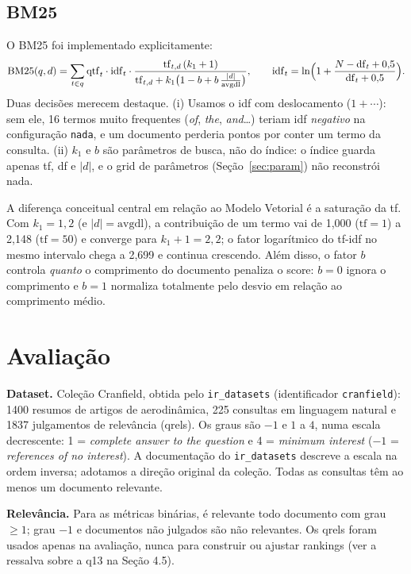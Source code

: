 \documentclass[10pt,a4paper]{article}
\begin{document}
\subsection{BM25}
O BM25 foi implementado explicitamente:
\[
  \mathrm{BM25}(q,d) = \sum_{t\in q} \mathrm{qtf}_t\cdot \mathrm{idf}_t\cdot
  \frac{\mathrm{tf}_{t,d}\,(k_1+1)}{\mathrm{tf}_{t,d} + k_1\bigl(1-b+b\,\frac{|d|}{\mathrm{avgdl}}\bigr)},
  \qquad
  \mathrm{idf}_t = \ln\Bigl(1+\frac{N-\mathrm{df}_t+0{,}5}{\mathrm{df}_t+0{,}5}\Bigr).
\]
Duas decisões merecem destaque. (i) Usamos o idf com deslocamento ($1+\cdots$): sem ele,
16 termos muito frequentes (\emph{of}, \emph{the}, \emph{and}\ldots) teriam idf
\emph{negativo} na configuração \texttt{nada}, e um documento perderia pontos por conter um termo
da consulta. (ii) $k_1$ e $b$ são parâmetros de busca, não do índice: o índice guarda
apenas tf, df e $|d|$, e o grid de parâmetros (Seção~\ref{sec:param}) não reconstrói nada.

A diferença conceitual central em relação ao Modelo Vetorial é a saturação da tf. Com
$k_1=1{,}2$ (e $|d|=\mathrm{avgdl}$), a contribuição de um termo vai de 1,000 ($\mathrm{tf}=1$) a
2,148 ($\mathrm{tf}=50$) e converge para $k_1+1=2{,}2$; o fator logarítmico do tf-idf no mesmo
intervalo chega a 2,699 e continua crescendo. Além disso, o fator $b$ controla \emph{quanto} o
comprimento do documento penaliza o score: $b=0$ ignora o comprimento e $b=1$ normaliza
totalmente pelo desvio em relação ao comprimento médio.

\section{Avaliação}
\textbf{Dataset.} Coleção Cranfield, obtida pelo \texttt{ir\_datasets} (identificador
\texttt{cranfield}): 1400 resumos de artigos de aerodinâmica, 225 consultas em linguagem natural e
1837 julgamentos de relevância (qrels). Os graus são $-1$ e $1$ a $4$, numa escala
decrescente: 1 = \emph{complete answer to the question} e 4 = \emph{minimum interest}
($-1$ = \emph{references of no interest}). A documentação do \texttt{ir\_datasets} descreve a escala
na ordem inversa; adotamos a direção original da coleção. Todas as consultas têm ao menos um
documento relevante.

\textbf{Relevância.} Para as métricas binárias, é relevante todo documento com grau $\geq 1$;
grau $-1$ e documentos não julgados são não relevantes. Os qrels foram usados apenas na
avaliação, nunca para construir ou ajustar rankings (ver a ressalva sobre a q13 na Seção 4.5).
\end{document}
